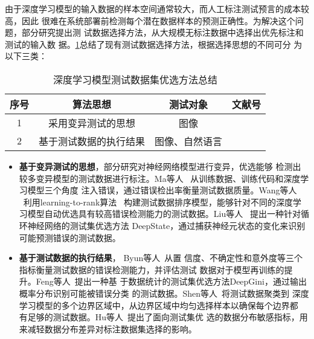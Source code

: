 由于深度学习模型的输入数据的样本空间通常较大，而人工标注测试预言的成本较高，因此
很难在系统部署前检测每个潜在数据样本的预测正确性。为解决这个问题，部分研究提出测
试数据选择方法，从大规模无标注数据中选择出优先标注和测试的输入数
据。\cref{tab:testingDataPri}总结了现有测试数据选择方法，根据选择思想的不同可分
为以下三类：

\begin{table}[htp]
	\renewcommand\arraystretch{1.5}
	\small
	\centering
	\caption{深度学习模型测试数据集优选方法总结}
	\label{tab:testingDataPri}
	\begin{tabular}{cccc}
		\toprule
		\textbf{序号} & \textbf{算法思想}  & \textbf{测试对象} & \textbf{文献号}                                                    \\
		\midrule
		1             & 采用变异测试的思想       & 图像              & \cite{Wang2021Prioritizing}\cite{Ma2018DeepMutation}  \cite{Liu2022DeepState}                    \\
		2             & 基于测试数据的执行结果       & 图像、自然语言  & \cite{Byun2019Input}\cite{Shen2020MultipleBoundary}\cite{Feng2020DeepGini}\cite{Hu2022AnEmpirical}\cite{Gao2022Adaptive} \\
		\bottomrule
	\end{tabular}
\end{table}

\begin{itemize}

	\item \textbf{基于变异测试的思想}，部分研究对神经网络模型进行变异，优选能够
	      检测出较多变异模型的测试数据进行标注。Ma等人
	      ~从训练数据、训练代码和深度学习模型三个角度
	      注入错误，通过错误检出率衡量测试数据质量。Wang等人
	      ~利用learning-to-rank算法
	      ~构建测试数据排序模型，能够针对不同的深度学
	      习模型自动优选具有较高错误检测能力的测试数据。Liu等人
	      ~提出一种针对循环神经网络的测试集优选方法
	      DeepState，通过捕获神经元状态的变化来识别可能预测错误的测试数据。  

	\item \textbf{基于测试数据的执行结果}， Byun等人~从置
	      信度、不确定性和意外度等三个指标衡量测试数据的错误检测能力，并评估测试
	      数据对于模型再训练的提升。Feng等人~提出一种基
	      于数据统计的测试集优选方法DeepGini，通过输出概率分布识别可能被错误分类
	      的测试数据。Shen等人~将测试数据聚类到
	      深度学习模型的多个边界区域中，从边界区域中均匀选择样本以确保每个边界都
	      有足够的测试数据。Hu等人~提出了面向测试集优
	      选的数据分布敏感指标，用来减轻数据分布差异对标注数据集选择的影响。

\end{itemize}

